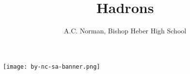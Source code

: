 \documentclass[nofonts,a4paper]{tufte-handout}
\title{Hadrons}
\author{A.C. Norman, Bishop Heber High School}
\date{}
\begin{document}
\maketitle%

\thispagestyle{empty}
%


\vfill

\noindent\texttt{[image: by-nc-sa-banner.png]}
\end{document}
